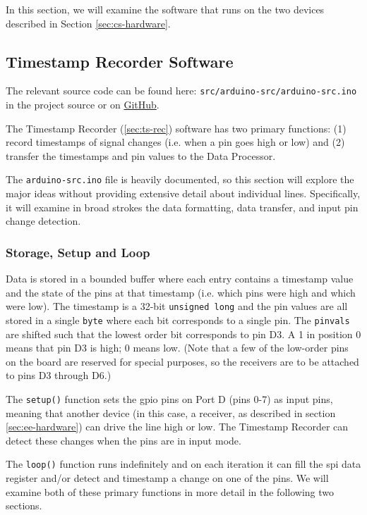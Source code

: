 \documentclass[12pt]{article}
\begin{document}
In this section, we will examine the software that runs on the two devices
described in Section \ref{sec:cs-hardware}.

\subsection{Timestamp Recorder Software}\label{sec:ts-rec-sw}

The relevant source code can be found here:
\texttt{src/arduino-src/arduino-src.ino} in the project source or on
\href{https://github.com/cabeese/crab-tracker/tree/master/src/arduino-src}
{GitHub}.


The Timestamp Recorder (\ref{sec:ts-rec}) software has two primary functions:
(1) record timestamps of signal changes (i.e. when a pin goes high or low) and
(2) transfer the timestamps and pin values to the Data Processor.

The \texttt{arduino-src.ino} file is heavily documented, so this section
will explore the major ideas without providing extensive detail about
individual lines.
Specifically, it will examine in broad strokes the data formatting, data
transfer, and input pin change detection.

\subsubsection{Storage, Setup and Loop}

Data is stored in a bounded buffer where each entry contains a timestamp value
and the state of the pins at that timestamp (i.e. which pins were high and
which were low).
The timestamp is a 32-bit \texttt{unsigned long} and the pin values are
all stored in a single \texttt{byte} where each bit corresponds to a single
pin.
The \texttt{pinvals} are shifted such that the lowest order bit corresponds
to pin D3.
A 1 in position 0 means that pin D3 is high; 0 means low.
(Note that a few of the low-order pins on the board are reserved for special
purposes, so the receivers are to be attached to pins D3 through D6.)

The \texttt{setup()} function sets the \gls{gpio} pins on Port D (pins 0-7)
as input pins, meaning that another device (in this case, a receiver, as
described in section \ref{sec:ee-hardware}) can drive the line high or low.
The Timestamp Recorder can detect these changes when the pins are in input
mode.

The \texttt{loop()} function runs indefinitely and on each iteration it can fill
the \gls{spi} data register and/or detect and timestamp a change on one of the
pins.
We will examine both of these primary functions in more detail in the following
two sections.
\end{document}
